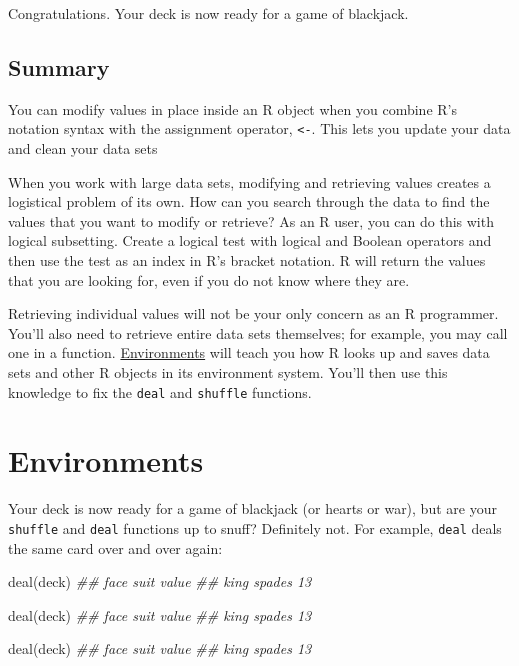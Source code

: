 \documentclass[
  letterpaper,
  DIV=11,
  numbers=noendperiod]{scrbook}
\newenvironment{Shaded}{\begin{snugshade}}{\end{snugshade}}
\newcommand{\DocumentationTok}[1]{\textcolor[rgb]{0.37,0.37,0.37}{\textit{#1}}}
\newcommand{\FunctionTok}[1]{\textcolor[rgb]{0.28,0.35,0.67}{#1}}
\newcommand{\NormalTok}[1]{\textcolor[rgb]{0.00,0.23,0.31}{#1}}
\begin{document}
Congratulations. Your deck is now ready for a game of blackjack.

\section{Summary}\label{summary-4}

You can modify values in place inside an R object when you combine R's
notation syntax with the assignment operator, \texttt{\textless{}-}.
This lets you update your data and clean your data sets

When you work with large data sets, modifying and retrieving values
creates a logistical problem of its own. How can you search through the
data to find the values that you want to modify or retrieve? As an R
user, you can do this with logical subsetting. Create a logical test
with logical and Boolean operators and then use the test as an index in
R's bracket notation. R will return the values that you are looking for,
even if you do not know where they are.

Retrieving individual values will not be your only concern as an R
programmer. You'll also need to retrieve entire data sets themselves;
for example, you may call one in a function.
\hyperref[sec-environments]{Environments} will teach you how R looks up
and saves data sets and other R objects in its environment system.
You'll then use this knowledge to fix the \texttt{deal} and
\texttt{shuffle} functions.

\chapter{Environments}\label{sec-environments}

Your deck is now ready for a game of blackjack (or hearts or war), but
are your \texttt{shuffle} and \texttt{deal} functions up to snuff?
Definitely not. For example, \texttt{deal} deals the same card over and
over again:

\begin{Shaded}
\begin{Highlighting}[]
\FunctionTok{deal}\NormalTok{(deck)}
\DocumentationTok{\#\# face   suit value}
\DocumentationTok{\#\# king spades    13}

\FunctionTok{deal}\NormalTok{(deck)}
\DocumentationTok{\#\# face   suit value}
\DocumentationTok{\#\# king spades    13}

\FunctionTok{deal}\NormalTok{(deck)}
\DocumentationTok{\#\# face   suit value}
\DocumentationTok{\#\# king spades    13}
\end{Highlighting}
\end{Shaded}
\end{document}
